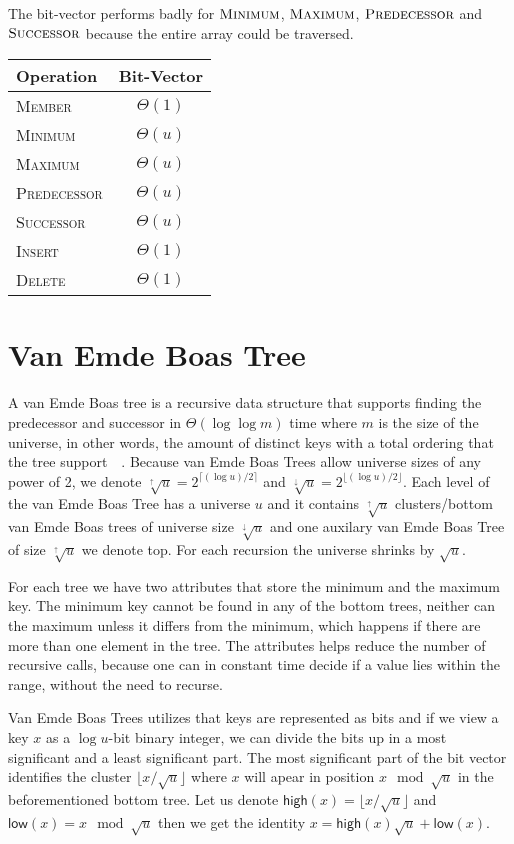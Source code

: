 \documentclass[oneside,11pt,openright]{report}
\newcommand{\BigT}[1]{\ensuremath{\Theta\left(#1\right)}}
\newcommand{\Insert}{\textsc{Insert}}
\newcommand{\Delete}{\textsc{Delete}}
\newcommand{\Member}{\textsc{Member}}
\newcommand{\Minimum}{\textsc{Minimum}}
\newcommand{\Maximum}{\textsc{Maximum}}
\newcommand{\Predecessor}{\textsc{Predecessor}}
\newcommand{\Successor}{\textsc{Successor}}
\newcommand{\HIGH}{\textsf{high}}
\newcommand{\LOW}{\textsf{low}}
\newcommand{\HIGHER}{\sqrt[\uparrow]{u}}
\newcommand{\LOWER}{\sqrt[\downarrow]{u}}
\begin{document}
The bit-vector performs badly for $\Minimum$, $\Maximum$, $\Predecessor$ and $\Successor$ because the entire array could be traversed.

\begin{center}
  \begin{tabular}{ l | c }
    Operation & Bit-Vector  \\ \hline
    \Member & $\BigT{1}$ \\ 
    \Minimum & $\BigT{u}$ \\ 
    \Maximum & $\BigT{u}$ \\ 
    \Predecessor & $\BigT{u}$ \\ 
    \Successor & $\BigT{u}$ \\ 
    \Insert & $\BigT{1}$ \\ 
    \Delete & $\BigT{1}$ \\
  \end{tabular}
\end{center}


\chapter{Van Emde Boas Tree}

A van Emde Boas tree is a recursive data structure that supports finding the predecessor and successor in \BigT{\log \log m} time where $m$ is the size of the universe, in other words, the amount of distinct keys with a total ordering that the tree support~\cite[p. 545]{ITA09}~\cite{VEB04}. Because van Emde Boas Trees allow universe sizes of any power of 2, we denote $\HIGHER = 2^{\lceil{(\log u)/2}\rceil}$ and $\LOWER = 2^{\lfloor{(\log u)/2}\rfloor}$. Each level of the van Emde Boas Tree has a universe $u$ and it contains $\HIGHER$ clusters/bottom van Emde Boas trees of universe size $\LOWER$ and one auxilary van Emde Boas Tree of size $\HIGHER$ we denote top. For each recursion the universe shrinks by $\sqrt{u}$.

For each tree we have two attributes that store the minimum and the maximum key. The minimum key cannot be found in any of the bottom trees, neither can the maximum unless it differs from the minimum, which happens if there are more than one element in the tree. The attributes helps reduce the number of recursive calls, because one can in constant time decide if a value lies within the range, without the need to recurse.

Van Emde Boas Trees utilizes that keys are represented as bits and if we view a key $x$ as a $\log u$-bit binary integer, we can divide the bits up in a most significant and a least significant part. The most significant part of the bit vector identifies the cluster $\lfloor{x/\sqrt{u}}\rfloor$ where $x$ will apear in position $x \mod \sqrt{u}$ in the beforementioned bottom tree. Let us denote $\HIGH(x) = \lfloor{x/\sqrt{u}}\rfloor$ and $\LOW(x) = x \mod \sqrt{u}$ then we get the identity $x = \HIGH(x) \sqrt{u} + \LOW(x)$.
\end{document}
